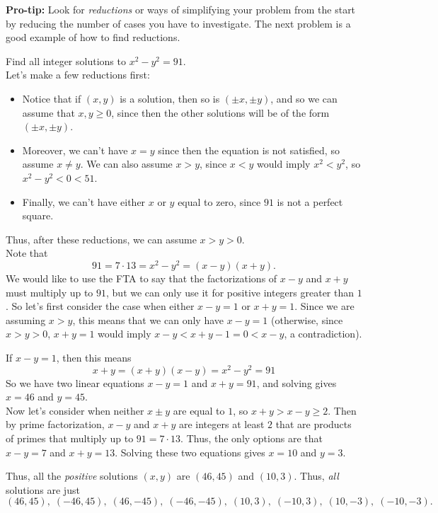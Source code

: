 \documentclass[11pt,dvipsnames]{book}
\numberwithin{equation}{section} %
\numberwithin{figure}{section} %
\numberwithin{table}{section} %
\begin{document}
{\bf Pro-tip:} Look for {\it reductions} or ways of simplifying your problem from the start by reducing the number of cases you have to investigate. The next problem is a good example of how to find reductions.

\begin{example}
Find all integer solutions to $x^2-y^2=91$. \\


Let's make a few reductions first:
\begin{itemize}
\item Notice that if $(x,y)$ is a solution, then so is $(\pm x,\pm y)$, and so we can assume that $x,y\geq 0$, since then the other solutions will be of the form $(\pm x,\pm y)$. 
\item Moreover, we can't have $x=y$ since then the equation is not satisfied, so assume $x\neq y$. We can also assume $x>y$, since $x<y$ would imply $x^2<y^2$, so $x^2-y^2<0<51$. 
\item Finally, we can't have either $x$ or $y$ equal to zero, since $91$ is not a perfect square. 
\end{itemize}
Thus, after these reductions, we can assume $x>y>0$.\\

Note that 
\[
91=7\cdot 13 = x^2-y^2=(x-y)(x+y).\] 
We would like to use the FTA to say that the factorizations of $x-y$ and $x+y$ must multiply up to $91$, but we can only use it for positive integers greater than $1$. So let's first consider the case when either $x-y=1$ or $x+y=1$. Since we are assuming $x>y$, this means that we can only have $x-y=1$ (otherwise, since $x>y>0$, $x+y=1$ would imply $x-y<x+y-1=0<x-y$, a contradiction). 

If $x-y=1$, then this means 
\[
x+y=(x+y)(x-y)=x^2-y^2=91
\]
So we have two linear equations $x-y=1$ and $x+y=91$, and solving gives $x=46$ and $y=45$. \\

Now let's consider when neither $x\pm y$ are equal to $1$, so $x+y>x-y\geq 2$. Then by prime factorization, $x-y$ and $x+y$ are integers at least $2$ that are products of primes that multiply up to $91=7\cdot 13$. Thus, the only options are that $x-y=7$ and $x+y=13$. Solving these two equations gives $x=10$ and $y=3$. 

Thus, all the {\it positive} solutions $(x,y)$ are $(46,45)$ and $(10,3)$. Thus, {\it all} solutions are just 
\[
(46,45), \; (-46,45), \; (46,-45), \; (-46,-45), \; (10,3), \; (-10,3), \; (10,-3), \; (-10,-3).
\]



\end{example}
\end{document}
